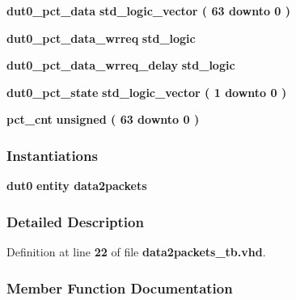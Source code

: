 \begin{DoxyCompactItemize}
{\bf dut0\+\_\+pct\+\_\+data} {\bfseries \textcolor{comment}{std\+\_\+logic\+\_\+vector}\textcolor{vhdlchar}{ }\textcolor{vhdlchar}{(}\textcolor{vhdlchar}{ }\textcolor{vhdlchar}{ } \textcolor{vhdldigit}{63} \textcolor{vhdlchar}{ }\textcolor{keywordflow}{downto}\textcolor{vhdlchar}{ }\textcolor{vhdlchar}{ } \textcolor{vhdldigit}{0} \textcolor{vhdlchar}{ }\textcolor{vhdlchar}{)}\textcolor{vhdlchar}{ }} 
\item 
{\bf dut0\+\_\+pct\+\_\+data\+\_\+wrreq} {\bfseries \textcolor{comment}{std\+\_\+logic}\textcolor{vhdlchar}{ }} 
\item 
{\bf dut0\+\_\+pct\+\_\+data\+\_\+wrreq\+\_\+delay} {\bfseries \textcolor{comment}{std\+\_\+logic}\textcolor{vhdlchar}{ }} 
\item 
{\bf dut0\+\_\+pct\+\_\+state} {\bfseries \textcolor{comment}{std\+\_\+logic\+\_\+vector}\textcolor{vhdlchar}{ }\textcolor{vhdlchar}{(}\textcolor{vhdlchar}{ }\textcolor{vhdlchar}{ } \textcolor{vhdldigit}{1} \textcolor{vhdlchar}{ }\textcolor{keywordflow}{downto}\textcolor{vhdlchar}{ }\textcolor{vhdlchar}{ } \textcolor{vhdldigit}{0} \textcolor{vhdlchar}{ }\textcolor{vhdlchar}{)}\textcolor{vhdlchar}{ }} 
\item 
{\bf pct\+\_\+cnt} {\bfseries \textcolor{comment}{unsigned}\textcolor{vhdlchar}{ }\textcolor{vhdlchar}{(}\textcolor{vhdlchar}{ }\textcolor{vhdlchar}{ } \textcolor{vhdldigit}{63} \textcolor{vhdlchar}{ }\textcolor{keywordflow}{downto}\textcolor{vhdlchar}{ }\textcolor{vhdlchar}{ } \textcolor{vhdldigit}{0} \textcolor{vhdlchar}{ }\textcolor{vhdlchar}{)}\textcolor{vhdlchar}{ }} 
\end{DoxyCompactItemize}
\subsubsection*{Instantiations}
 \begin{DoxyCompactItemize}
\item 
{\bf dut0}  {\bfseries entity data2packets}   
\end{DoxyCompactItemize}


\subsubsection{Detailed Description}


Definition at line {\bf 22} of file {\bf data2packets\+\_\+tb.\+vhd}.



\subsubsection{Member Function Documentation}
